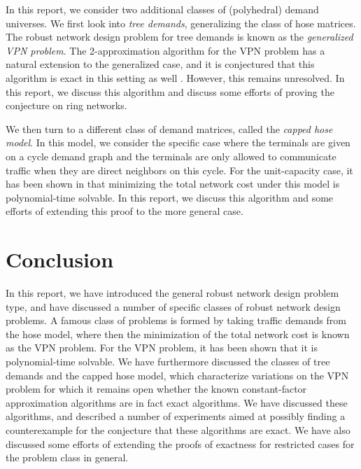 \documentclass[11pt]{article}
\theoremstyle{definition}
\begin{document}
    In this report, we consider two additional classes of (polyhedral) demand universes.
    We first look into \emph{tree demands}, generalizing the class of hose matrices.
    The robust network design problem for tree demands is known as the \emph{generalized VPN problem}.
    The 2-approximation algorithm for the VPN problem has a natural extension to the generalized case, and it is conjectured that this algorithm is exact in this setting as well \cite{OLVER2016191}.
    However, this remains unresolved.
    In this report, we discuss this algorithm and discuss some efforts of proving the conjecture on ring networks.

    We then turn to a different class of demand matrices, called the \emph{capped hose model}.
    In this model, we consider the specific case where the terminals are given on a cycle demand graph and the terminals are only allowed to communicate traffic when they are direct neighbors on this cycle.
    For the unit-capacity case, it has been shown in \cite{bosman2017exploring} that minimizing the total network cost under this model is polynomial-time solvable.
    In this report, we discuss this algorithm and some efforts of extending this proof to the more general case.

    

    

    \section{Conclusion}
    In this report, we have introduced the general robust network design problem type, and have discussed a number of specific classes of robust network design problems.
    A famous class of problems is formed by taking traffic demands from the hose model, where then the minimization of the total network cost is known as the VPN problem.
    For the VPN problem, it has been shown that it is polynomial-time solvable.
    We have furthermore discussed the classes of tree demands and the capped hose model, which characterize variations on the VPN problem for which it remains open whether the known constant-factor approximation algorithms are in fact exact algorithms.
    We have discussed these algorithms, and described a number of experiments aimed at possibly finding a counterexample for the conjecture that these algorithms are exact.
    We have also discussed some efforts of extending the proofs of exactness for restricted cases for the problem class in general.

    
    

    \clearpage
    \appendix
    
\end{document}
